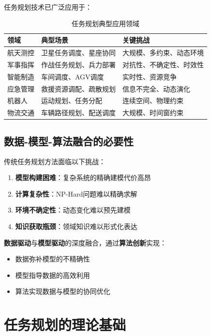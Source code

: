 \documentclass[12pt,a4paper]{ctexart}
\begin{document}
任务规划技术已广泛应用于：
\begin{table}[htbp]
\centering
\caption{任务规划典型应用领域}
\begin{tabular}{p{3cm}p{4cm}p{5cm}}
\toprule
\textbf{领域} & \textbf{典型场景} & \textbf{关键挑战} \\
\midrule
航天测控 & 卫星任务调度、星座协同 & 大规模、多约束、动态环境 \\
军事指挥 & 作战任务规划、兵力部署 & 对抗性、不确定性、时效性 \\
智能制造 & 车间调度、AGV调度 & 实时性、资源竞争 \\
应急管理 & 救援资源调配、疏散规划 & 信息不完全、动态演化 \\
机器人 & 运动规划、任务分配 & 连续空间、物理约束 \\
物流交通 & 车辆路径规划、配送调度 & 大规模、时间窗约束 \\
\bottomrule
\end{tabular}
\end{table}

\subsection{数据-模型-算法融合的必要性}

传统任务规划方法面临以下挑战：
\begin{enumerate}[leftmargin=2em]
    \item \textbf{模型构建困难}：复杂系统的精确建模代价高昂
    \item \textbf{计算复杂性}：NP-Hard问题难以精确求解
    \item \textbf{环境不确定性}：动态变化难以预先建模
    \item \textbf{知识获取瓶颈}：领域知识难以形式化表达
\end{enumerate}

\begin{fusionbox}[数据-模型-算法融合的核心思想]
\textbf{数据驱动}与\textbf{模型驱动}的深度融合，通过\textbf{算法创新}实现：
\begin{itemize}
    \item 数据弥补模型的不精确性
    \item 模型指导数据的高效利用
    \item 算法实现数据与模型的协同优化
\end{itemize}
\end{fusionbox}

\section{任务规划的理论基础}
\end{document}
